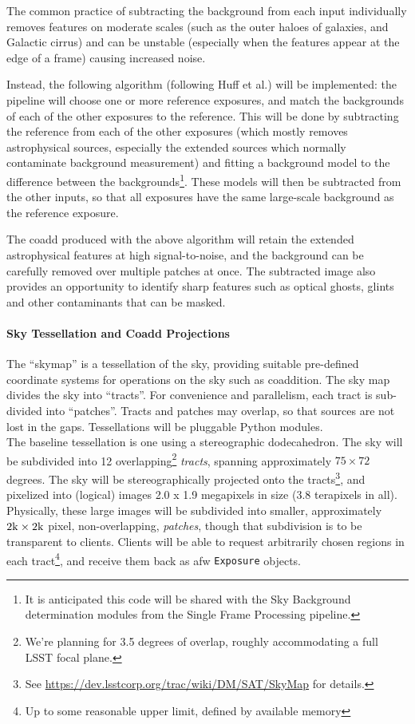 \documentclass[12pt]{article}
\begin{document}
The common practice of subtracting the background from each input individually removes features on moderate scales (such as the outer haloes of galaxies, and Galactic cirrus) and can be unstable (especially when the features appear at the edge of a frame) causing increased noise.

Instead, the following algorithm (following Huff et al.) will be implemented: the pipeline will choose one or more reference exposures, and match the backgrounds of each of the other exposures to the reference.  This will be done by subtracting the reference from each of the other exposures (which mostly removes astrophysical sources, especially the extended sources which normally contaminate background measurement) and fitting a background model to the difference between the backgrounds\footnote{It is anticipated this code will be shared with the Sky Background determination modules from the Single Frame Processing pipeline.}. These models will then be subtracted from the other inputs, so that all exposures have the same large-scale background as the reference exposure. 

The coadd produced with the above algorithm will retain the extended astrophysical features at high signal-to-noise, and the background can be carefully removed over multiple patches at once. The subtracted image also provides an opportunity to identify sharp features such as optical ghosts, glints and other contaminants that can be masked.

\paragraph{Sky Tessellation and Coadd Projections\label{alg:skymap}}

The ``skymap'' is a tessellation of the sky, providing suitable pre-defined coordinate systems for operations on the sky such as coaddition.  The sky map divides the sky into ``tracts''.  For convenience and parallelism, each tract is sub-divided into ``patches''.  Tracts and patches may overlap, so that sources are not lost in the gaps. Tessellations will be pluggable Python modules.
\\

The baseline tessellation is one using a stereographic dodecahedron. The sky will be subdivided into 12 overlapping\footnote{We're planning for 3.5 degrees of overlap, roughly accommodating a full LSST focal plane.} {\em tracts}, spanning approximately $75 \times 72$ degrees. The sky will be stereographically projected onto the tracts\footnote{See \url{https://dev.lsstcorp.org/trac/wiki/DM/SAT/SkyMap} for details.}, and pixelized into (logical) images 2.0 x 1.9 megapixels in size (3.8 terapixels in all). Physically, these large images will be subdivided into smaller, approximately $2{\rm k} \times 2{\rm k}$ pixel, non-overlapping, {\em patches}, though that subdivision is to be transparent to clients. Clients will be able to request arbitrarily chosen regions in each tract\footnote{Up to some reasonable upper limit, defined by available memory}, and receive them back as afw {\tt Exposure} objects.
\end{document}
